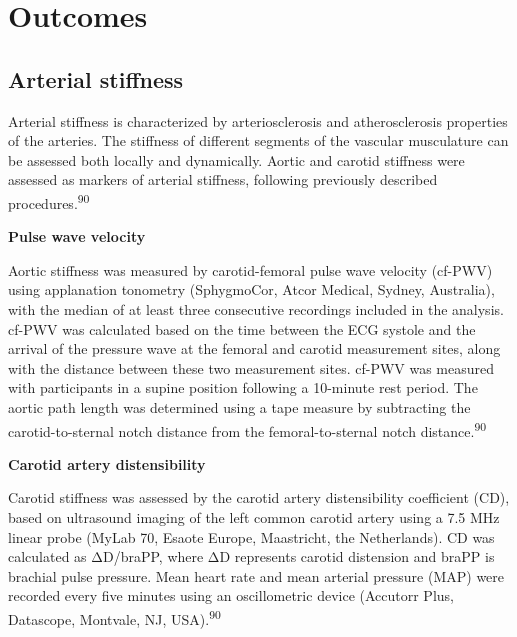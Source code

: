 \documentclass[
  a4paper,
  headsepline=true,
  open=left]{scrbook}
\begin{document}
\hypertarget{outcomes}{%
\section{Outcomes}\label{outcomes}}

\hypertarget{arterial-stiffness}{%
\subsection{Arterial stiffness}\label{arterial-stiffness}}

Arterial stiffness is characterized by arteriosclerosis and
atherosclerosis properties of the arteries. The stiffness of different
segments of the vascular musculature can be assessed both locally and
dynamically. Aortic and carotid stiffness were assessed as markers of
arterial stiffness, following previously described
procedures.\textsuperscript{90}

\textbf{Pulse wave velocity}

Aortic stiffness was measured by carotid-femoral pulse wave velocity
(cf-PWV) using applanation tonometry (SphygmoCor, Atcor Medical, Sydney,
Australia), with the median of at least three consecutive recordings
included in the analysis. cf-PWV was calculated based on the time
between the ECG systole and the arrival of the pressure wave at the
femoral and carotid measurement sites, along with the distance between
these two measurement sites. cf-PWV was measured with participants in a
supine position following a 10-minute rest period. The aortic path
length was determined using a tape measure by subtracting the
carotid-to-sternal notch distance from the femoral-to-sternal notch
distance.\textsuperscript{90}

\textbf{Carotid artery distensibility}

Carotid stiffness was assessed by the carotid artery distensibility
coefficient (CD), based on ultrasound imaging of the left common carotid
artery using a 7.5 MHz linear probe (MyLab 70, Esaote Europe,
Maastricht, the Netherlands). CD was calculated as ΔD/braPP, where ΔD
represents carotid distension and braPP is brachial pulse pressure. Mean
heart rate and mean arterial pressure (MAP) were recorded every five
minutes using an oscillometric device (Accutorr Plus, Datascope,
Montvale, NJ, USA).\textsuperscript{90}
\end{document}
